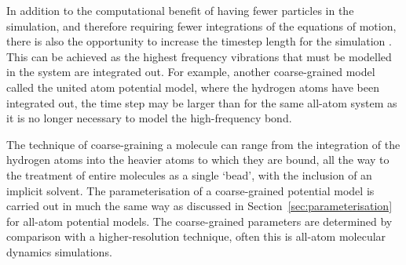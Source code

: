 In addition to the computational benefit of having fewer particles in the simulation, and therefore requiring fewer integrations of the equations of motion, there is also the opportunity to increase the timestep length for the simulation \cite{pluhackova_biomembranes_2015}.
This can be achieved as the highest frequency vibrations that must be modelled in the system are integrated out.
For example, another coarse-grained model called the united atom potential model, where the hydrogen atoms have been integrated out, the time step may be larger than for the same all-atom system as it is no longer necessary to model the high-frequency  bond.

The technique of coarse-graining a molecule can range from the integration of the hydrogen atoms into the heavier atoms to which they are bound, all the way to the treatment of entire molecules as a single `bead', with the inclusion of an implicit solvent.
The parameterisation of a coarse-grained potential model is carried out in much the same way as discussed in Section~\ref{sec:parameterisation} for all-atom potential models.
The coarse-grained parameters are determined by comparison with a higher-resolution technique, often this is all-atom molecular dynamics simulations.